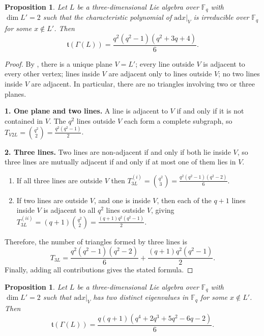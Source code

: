 \documentclass[11pt]{amsart}
\theoremstyle{plain}
\newtheorem{proposition}[theorem]{Proposition}
\def\F{\mathbb{F}}
\def\ad{\mathrm{ad}}
\begin{document}
\smallskip

\begin{proposition}\label{irreducible}
Let $L$ be a three-dimensional Lie algebra over $\F_q$ with $\dim L'=2$ such that
the characteristic polynomial of $\ad x |_V$ is irreducible over $\F_q$
for some $x\notin L'$.  Then 
\[\mathfrak{t}(\Gamma(L)) = \frac{q^2(q^2-1)(q^2+3q+4)}{6}.\]
\end{proposition}

\begin{proof}
By \cite[Proposition 4.7]{TZG}, there is a unique plane $V=L'$; every line outside $V$ is adjacent to every other vertex; lines inside $V$ are adjacent only to lines outside $V$; no two lines inside $V$ are adjacent. In particular, there are no triangles involving two or three planes.

\medskip
\noindent\textbf{1. One plane and two lines.}
A line is adjacent to $V$ if and only if it is not contained in $V$. The $q^2$ lines outside $V$ each form a complete subgraph, so $T_{V2L} = \binom{q^2}{2} = \frac{q^2(q^2-1)}{2}$.

\smallskip
\noindent\textbf{2. Three lines.}
Two lines are non-adjacent if and only if both lie inside $V$, so three lines are
mutually adjacent if and only if at most one of them lies in $V$. 
\begin{enumerate}
\item[(i)] If all three lines are outside $V$ then $T_{3L}^{(i)} = \binom{q^2}{3} = \frac{q^2(q^2-1)(q^2-2)}{6}$.
    
\item[(ii)] If two lines are outside $V$, and one is inside $V$, then each of the $q+1$ lines inside $V$ is adjacent to all $q^2$ lines outside $V$, giving $T_{3L}^{(ii)} = (q+1)\binom{q^2}{2} = \frac{(q+1)q^2(q^2-1)}{2}$.
\end{enumerate}
Therefore, the number of triangles formed by three lines is
\[T_{3L} = \frac{q^2(q^2-1)(q^2-2)}{6} + \frac{(q+1)q^2(q^2-1)}{2}.\]
Finally, adding all contributions gives the stated formula.
\end{proof}



\begin{proposition}\label{2EigenVal}
Let $L$ be a three-dimensional Lie algebra over $\F_q$ with $\dim L'=2$ such that
$\ad x |_V$ has two distinct eigenvalues in $\F_q$ for some $x\notin L'$.
Then 
\[\mathfrak{t}(\Gamma(L)) = \frac{q(q+1)(q^4+2q^3+5q^2-6q-2)}{6}.\]
\end{proposition}
\end{document}
